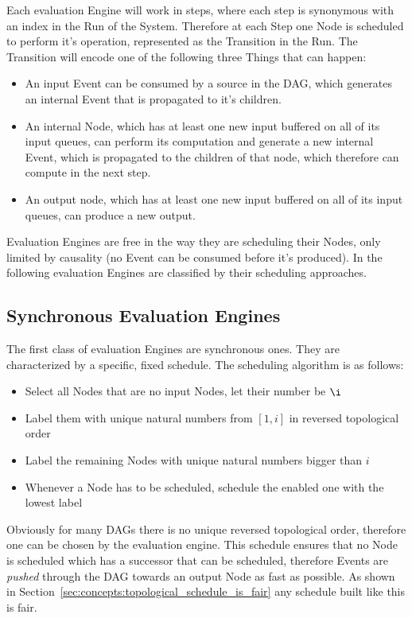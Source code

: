 Each evaluation Engine will work in steps, where each step is synonymous with an index in the Run of the System.
Therefore at each Step one Node is scheduled to perform it's operation, represented as the Transition in the Run.
The Transition will encode one of the following three Things that can happen:

\begin{itemize}
  \item An input Event can be consumed by a source in the DAG, which generates an internal Event that is propagated to it's children.
  \item An internal Node, which has at least one new input buffered on all of its input queues, can perform
    its computation and generate a new internal Event, which is propagated to the children of that node, which therefore can compute in the next step.
  \item An output node, which has at least one new input buffered on all of its input queues, can produce a new output.
\end{itemize}

Evaluation Engines are free in the way they are scheduling their Nodes, only limited by causality (no Event can be consumed before it's produced).
In the following evaluation Engines are classified by their scheduling approaches.

\subsection{Synchronous Evaluation Engines}
\label{sec:concepts:behaviour_without_timing:synchronous}

The first class of evaluation Engines are synchronous ones.
They are characterized by a specific, fixed schedule.
The scheduling algorithm is as follows:

\begin{itemize}
  \item Select all Nodes that are no input Nodes, let their number be \(\i\)
  \item Label them with unique natural numbers from \([1,i]\) in reversed topological order
  \item Label the remaining Nodes with unique natural numbers bigger than \(i\)
  \item Whenever a Node has to be scheduled, schedule the enabled one with the lowest label
\end{itemize}

Obviously for many DAGs there is no unique reversed topological order, therefore one can be chosen by the evaluation engine.
This schedule ensures that no Node is scheduled which has a successor that can be scheduled, therefore Events are \emph{pushed} through the DAG towards an output Node as fast as possible.
As shown in Section~\ref{sec:concepts:topological_schedule_is_fair} any schedule built like this is fair.

